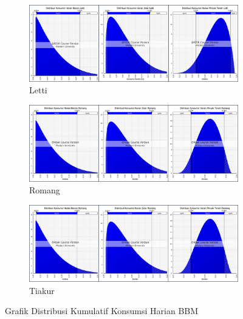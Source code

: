 \begin{figure}[htbp]
    \begin{subfigure}[b]{0.48\textwidth}
        \centering
        \includegraphics[width=\textwidth]{gambar/cons-bbm-letti.png}
        \caption{Letti}
        \label{fig:cons-bbm-letti}
    \end{subfigure}
    \hfill
    \begin{subfigure}[b]{0.48\textwidth}
        \centering
        \includegraphics[width=\textwidth]{gambar/cons-bbm-romang.png}
        \caption{Romang}
        \label{fig:cons-bbm-romang}
    \end{subfigure}
    
    \vspace{1em}
    
    \begin{subfigure}[b]{0.48\textwidth}
        \centering
        \includegraphics[width=\textwidth]{gambar/cons-bbm-romang.png}
        \caption{Tiakur}
        \label{fig:cons-bbm-tiakur}
    \end{subfigure}
    
    \caption{Grafik Distribusi Kumulatif Konsumsi Harian BBM}
    \label{fig:all-bbm-graphs}
\end{figure}

